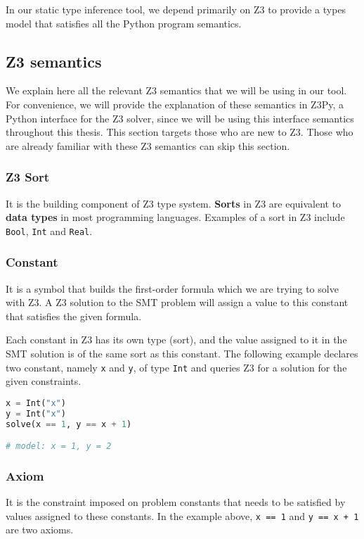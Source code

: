 In our static type inference tool, we depend primarily on Z3 to provide a types model that satisfies all the Python program semantics.

\subsection{Z3 semantics}
We explain here all the relevant Z3 semantics that we will be using in our tool. For convenience, we will provide the explanation of these semantics in Z3Py, a Python interface for the Z3 solver, since we will be using this interface semantics throughout this thesis. This section targets those who are new to Z3. Those who are already familiar with these Z3 semantics can skip this section.

\subsubsection{Z3 Sort}
It is the building component of Z3 type system. \textbf{Sorts} in Z3 are equivalent to \textbf{data types} in most programming languages. Examples of a sort in Z3 include \lstinline|Bool|, \lstinline|Int| and \lstinline|Real|.

\subsubsection{Constant}
It is a symbol that builds the first-order formula which we are trying to solve with Z3. A Z3 solution to the SMT problem will assign a value to this constant that satisfies the given formula.

Each constant in Z3 has its own type (sort), and the value assigned to it in the SMT solution is of the same sort as this constant. The following example declares two constant, namely \lstinline|x| and \lstinline|y|, of type \lstinline|Int| and queries Z3 for a solution for the given constraints.

\begin{lstlisting}[language=python]
x = Int("x")
y = Int("x")
solve(x == 1, y == x + 1)

# model: x = 1, y = 2
\end{lstlisting}


\subsubsection{Axiom}
It is the constraint imposed on problem constants that needs to be satisfied by values assigned to these constants. In the example above, \lstinline|x == 1| and \lstinline|y == x + 1| are two axioms.

